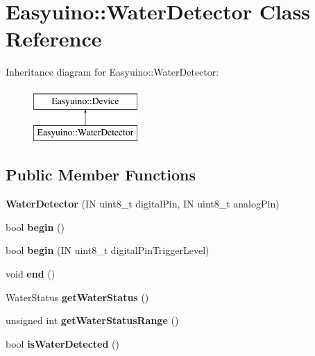 \hypertarget{class_easyuino_1_1_water_detector}{}\section{Easyuino\+:\+:Water\+Detector Class Reference}
\label{class_easyuino_1_1_water_detector}
Inheritance diagram for Easyuino\+:\+:Water\+Detector\+:\begin{figure}[H]
\begin{center}
\leavevmode
\includegraphics[height=2.000000cm]{class_easyuino_1_1_water_detector}
\end{center}
\end{figure}
\subsection*{Public Member Functions}
\begin{DoxyCompactItemize}
\item 
\mbox{\label{class_easyuino_1_1_water_detector_a33690612b2b89efcfb97d4967b16c617}} 
{\bfseries Water\+Detector} (IN uint8\+\_\+t digital\+Pin, IN uint8\+\_\+t analog\+Pin)
\item 
\mbox{\label{class_easyuino_1_1_water_detector_af7a0ec32d6abcb8c1060f493525d5228}} 
bool {\bfseries begin} ()
\item 
\mbox{\label{class_easyuino_1_1_water_detector_a06ac56298c56026691d7d6a9dbb63748}} 
bool {\bfseries begin} (IN uint8\+\_\+t digital\+Pin\+Trigger\+Level)
\item 
\mbox{\label{class_easyuino_1_1_water_detector_a9c1473536f47b2a7d8e1f8fb1bf5f3fd}} 
void {\bfseries end} ()
\item 
\mbox{\label{class_easyuino_1_1_water_detector_a0dfefd3b3aa2ed21f30ceb8041a8652a}} 
Water\+Status {\bfseries get\+Water\+Status} ()
\item 
\mbox{\label{class_easyuino_1_1_water_detector_a4a4c4a0ab6ae8a51535762f38b4f0d01}} 
unsigned int {\bfseries get\+Water\+Status\+Range} ()
\item 
\mbox{\label{class_easyuino_1_1_water_detector_a9ea69c2eec25543fad47759379d62ce6}} 
bool {\bfseries is\+Water\+Detected} ()
\end{DoxyCompactItemize}
